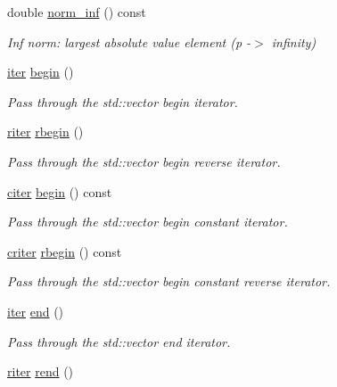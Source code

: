 \begin{DoxyCompactItemize}
double \hyperlink{classLuna_1_1Vector_a54e835cea735921c7487fb2451bca258}{norm\+\_\+inf} () const
\begin{DoxyCompactList}\small\item\em Inf norm\+: largest absolute value element (p -\/$>$ infinity) \end{DoxyCompactList}\item 
\hyperlink{classLuna_1_1Vector_aa6c4164f0cd114da31acfde53a36d65e}{iter} \hyperlink{classLuna_1_1Vector_a88e47962286f0dd912fb19849731e67a}{begin} ()
\begin{DoxyCompactList}\small\item\em Pass through the std\+::vector begin iterator. \end{DoxyCompactList}\item 
\hyperlink{classLuna_1_1Vector_a6db6c6b09df2c68bbfd1960c56bb20d5}{riter} \hyperlink{classLuna_1_1Vector_ac7d078c9f67745df2865f50577722926}{rbegin} ()
\begin{DoxyCompactList}\small\item\em Pass through the std\+::vector begin reverse iterator. \end{DoxyCompactList}\item 
\hyperlink{classLuna_1_1Vector_a90cff5eab2782bc1c6aaa879ce18a2b8}{citer} \hyperlink{classLuna_1_1Vector_ad4ac7dad7a59a052ca549319f1b1d5a6}{begin} () const
\begin{DoxyCompactList}\small\item\em Pass through the std\+::vector begin constant iterator. \end{DoxyCompactList}\item 
\hyperlink{classLuna_1_1Vector_a66e997f05169640055703449672be075}{criter} \hyperlink{classLuna_1_1Vector_a62b4a362a308d2348c2d035c0d245f0c}{rbegin} () const
\begin{DoxyCompactList}\small\item\em Pass through the std\+::vector begin constant reverse iterator. \end{DoxyCompactList}\item 
\hyperlink{classLuna_1_1Vector_aa6c4164f0cd114da31acfde53a36d65e}{iter} \hyperlink{classLuna_1_1Vector_a94f0c4fd25cb841b21d7bf7be4d6004f}{end} ()
\begin{DoxyCompactList}\small\item\em Pass through the std\+::vector end iterator. \end{DoxyCompactList}\item 
\hyperlink{classLuna_1_1Vector_a6db6c6b09df2c68bbfd1960c56bb20d5}{riter} \hyperlink{classLuna_1_1Vector_a830d3e3c9668a6e112086feeb06516e4}{rend} ()

\end{DoxyCompactItemize}
